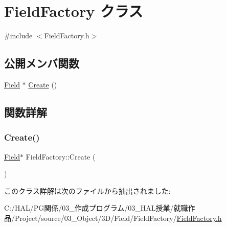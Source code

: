 \hypertarget{class_field_factory}{}\section{Field\+Factory クラス}
\label{class_field_factory}


{\ttfamily \#include $<$Field\+Factory.\+h$>$}

\subsection*{公開メンバ関数}
\begin{DoxyCompactItemize}
\item 
\mbox{\hyperlink{class_field}{Field}} $\ast$ \mbox{\hyperlink{class_field_factory_a7e2a9847756bbb43f9942a219cc69125}{Create}} ()
\end{DoxyCompactItemize}


\subsection{関数詳解}
\mbox{\label{class_field_factory_a7e2a9847756bbb43f9942a219cc69125}} 
\subsubsection{\texorpdfstring{Create()}{Create()}}
{\footnotesize\ttfamily \mbox{\hyperlink{class_field}{Field}}$\ast$ Field\+Factory\+::\+Create (\begin{DoxyParamCaption}{ }\end{DoxyParamCaption})\hspace{0.3cm}{\ttfamily [inline]}}



このクラス詳解は次のファイルから抽出されました\+:\begin{DoxyCompactItemize}
\item 
C\+:/\+H\+A\+L/\+P\+G関係/03\+\_\+作成プログラム/03\+\_\+\+H\+A\+L授業/就職作品/\+Project/source/03\+\_\+\+Object/3\+D/\+Field/\+Field\+Factory/\mbox{\hyperlink{_field_factory_8h}{Field\+Factory.\+h}}\end{DoxyCompactItemize}
